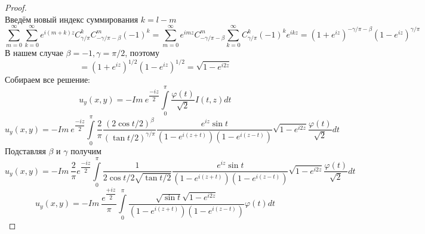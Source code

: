 \documentclass[12pt, a4paper]{extarticle}
\numberwithin{equation}{section}
\numberwithin{lemma}{section}
\numberwithin{definition}{section}
\numberwithin{notabene}{section}
\numberwithin{corollary}{section}
\begin{document}
\begin{proof}
\begin{equation*}
	\end{equation*}
	Введём новый индекс суммирования $k = l -m$
	\begin{equation*}
		\sum\limits_{m=0}^{\infty} \sum\limits_{k=0}^{\infty} e^{i(m+k)z} C^{k}_{\gamma/\pi} C^{m}_{-\gamma/\pi - \beta} (-1)^{k} = \sum\limits_{m=0}^{\infty} e^{imz} C^{m}_{-\gamma/\pi - \beta} \sum\limits_{k=0}^{\infty}  C^{k}_{\gamma/\pi} (-1)^k e^{ikz} = (1 + e^{iz})^{-\gamma/\pi - \beta} (1- e^{iz})^{\gamma/\pi} 
	\end{equation*}
	В нашем случае $\beta = -1, \gamma = \pi/2$, поэтому
	\begin{equation*}
		= (1 + e^{iz})^{1/2} (1- e^{iz})^{1/2} =\sqrt{1 - e^{i2z}} 
	\end{equation*}
	Собираем все решение:
	\begin{equation*}
		u_y(x,y) = - Im\ e^{\dfrac{-iz}{2}} \int\limits_0^\pi \dfrac{\varphi(t)}{\sqrt2} I(t,z) dt 
	\end{equation*}
	\begin{equation*}
	u_y(x,y) = - Im\ e^{\dfrac{-iz}{2}} \int\limits_0^\pi \dfrac{2}{\pi}\dfrac{(2\cos{t/2})^\beta}{(\tan{t/2})^{\gamma/\pi}}  \dfrac{e^{iz} \sin{t}}{\left(1 - e^{i(z+t)} \right) \left(1 - e^{i(z-t)}\right)} \sqrt{1 - e^{i2z}} \dfrac{\varphi(t)}{\sqrt2} dt
	\end{equation*}
	Подставляя $\beta$ и $\gamma$ получим
		\begin{equation*}
		u_y(x,y) = - Im\  \dfrac{2}{\pi} e^{\dfrac{-iz}{2}} \int\limits_0^\pi \dfrac{1}{2\cos{t/2} \sqrt{\tan{t/2}}}  \dfrac{e^{iz} \sin{t}}{\left(1 - e^{i(z+t)} \right) \left(1 - e^{i(z-t)}\right)} \sqrt{1 - e^{i2z}} \dfrac{\varphi(t)}{\sqrt2} dt
	\end{equation*}
	\begin{equation*}
	u_y(x,y) = - Im\  \dfrac{e^{\dfrac{+iz}{2}}}{\pi}  \int\limits_0^\pi  \dfrac{\sqrt{\sin{t}} \sqrt{1 - e^{i2z}}}{\left(1 - e^{i(z+t)} \right) \left(1 - e^{i(z-t)}\right)}  \varphi(t) dt
\end{equation*}
	\end{proof}
\end{document}
